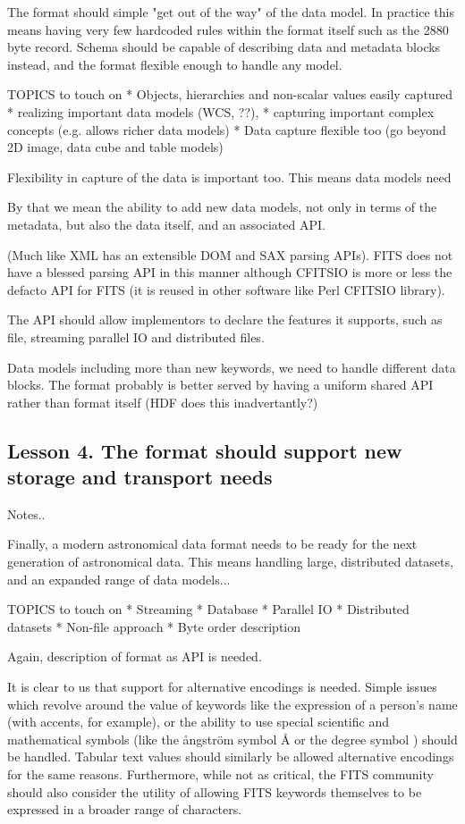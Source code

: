 \documentclass[final,authoryear,5p,times,twocolumn]{elsarticle}
\begin{document}
{{{The format should simple "get out of the way" of the data model. In practice
this means having very few hardcoded rules within the format itself such
as the 2880 byte record. Schema should be capable of describing data and
metadata blocks instead, and the format flexible enough to handle any model.

TOPICS to touch on
* Objects, hierarchies and non-scalar values easily captured
* realizing important data models (WCS, ??),
* capturing important complex concepts (e.g. allows richer data models)
* Data capture flexible too (go beyond 2D image, data cube and table models)

Flexibility in capture of the data is important too. This means
data models need



By that we mean the ability to add new data models, not only in terms
of the metadata, but also the data itself, and an associated API. 

(Much like XML has an extensible DOM and SAX parsing APIs). FITS does
not have a blessed parsing API in this manner although CFITSIO is more 
or less the defacto API for FITS (it is reused in other software like 
Perl CFITSIO library). 

The API should allow implementors to declare the features it supports, 
such as file, streaming parallel IO and distributed files.

Data models including more than new keywords, we need to handle different
data blocks. The format probably is better served by having a uniform
shared API rather than format itself (HDF does this inadvertantly?)

}


\subsection{Lesson 4. The format should support new storage and transport needs}

{\color{red} Notes..

Finally, a modern astronomical data format needs to be ready for
the next generation of astronomical data. This means handling 
large, distributed datasets, and an expanded range of data models...

TOPICS to touch on
* Streaming
* Database
* Parallel IO
* Distributed datasets
* Non-file approach
* Byte order description

Again, description of format as API is needed.
 

It is clear to us that support for alternative encodings is needed.
Simple issues which revolve around the value of keywords like the
expression of a person's name (with accents, for example), or the
ability to use special scientific and mathematical symbols (like the
\r{a}ngstr\"{o}m symbol \r{A} or the degree symbol \degree) should be
handled. Tabular text values should similarly be allowed alternative
encodings for the same reasons.  Furthermore, while not as critical, the
FITS community should also consider the utility of allowing FITS
keywords themselves to be expressed in a broader range of characters.

}}}
\end{document}
